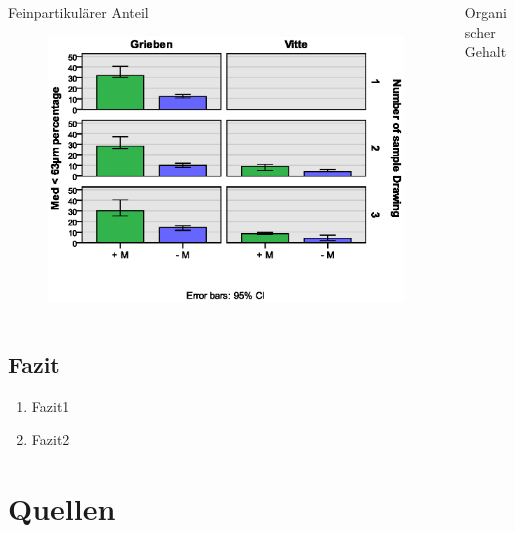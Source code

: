 \documentclass{beamer}
\begin{document}
\begin{frame}
\begin{columns}
\begin{column}{5.5cm}
Feinpartikulärer Anteil
\begin{figure}
\includegraphics[width=\textwidth]{images/sedimentparameter/S_Parameter_63_neu1.eps}
\end{figure}
\end{column}
\begin{column}{5.5cm}
\pause
Organischer Gehalt
\end{column}
\end{columns}
\end{frame}

\subsection{Fazit}
\begin{frame}
\begin{enumerate}
\item Fazit1
\item Fazit2
\end{enumerate}
\end{frame}

\section{Quellen}
\begin{frame}

\end{frame}
\end{document}
